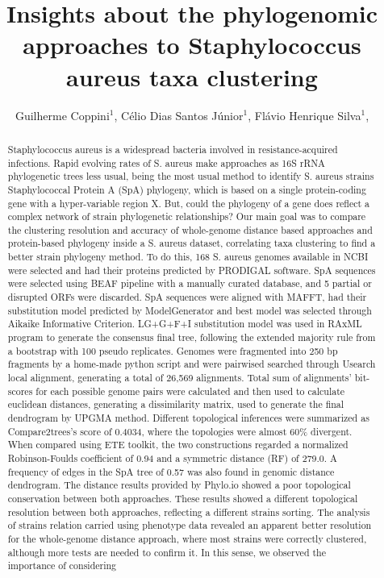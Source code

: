 \documentclass[twoside]{article}
\title{\vspace{-15mm}\fontsize{24pt}{10pt}\selectfont\textbf{ Insights about the phylogenomic approaches to Staphylococcus aureus taxa clustering }} %
\author{ Guilherme Coppini$^{1}$, Célio Dias Santos Júnior$^{1}$, Flávio Henrique Silva$^{1}$, }
\affil{ 1 Federal University of São Carlos

 }
\date{}
\begin{document}
  
  
  \maketitle %
  
  
  \thispagestyle{fancy} %
  
  
  \begin{abstract}
  Staphylococcus aureus is a widespread bacteria involved in resistance-acquired infections. Rapid evolving rates of S. aureus make approaches as 16S rRNA phylogenetic trees less usual, being the most usual method to identify S. aureus strains Staphylococcal Protein A  (SpA) phylogeny, which is based on a single protein-coding gene with a hyper-variable region X. But, could the phylogeny of  a gene does reflect a complex network of strain phylogenetic relationships? Our main goal was to compare the clustering resolution and accuracy of whole-genome distance based approaches and protein-based phylogeny inside a S. aureus dataset, correlating taxa clustering to find a better strain phylogeny method. To do this, 168 S. aureus genomes available in NCBI were selected and had their proteins predicted by PRODIGAL software. SpA sequences were selected using BEAF pipeline with a manually curated database, and 5 partial or disrupted ORFs were discarded. SpA sequences were aligned with MAFFT, had their substitution model predicted by ModelGenerator and best model was selected through Aikaike Informative Criterion. LG+G+F+I substitution model was used in RAxML program to generate the consensus final tree, following the extended majority rule from a bootstrap with 100 pseudo replicates. Genomes were fragmented into 250 bp fragments by a home-made python script and were pairwised searched through Usearch local alignment, generating a total of 26,569 alignments. Total sum of alignments' bit-scores for each possible genome pairs were calculated and then used to calculate euclidean distances, generating a dissimilarity matrix, used to generate the final dendrogram by UPGMA method. Different topological inferences were summarized as Compare2trees's score of 0.4034, where the topologies were almost 60\% divergent. When compared using ETE toolkit, the two constructions regarded a normalized Robinson-Foulds coefficient of 0.94 and a symmetric distance (RF) of 279.0. A frequency of edges in the SpA tree of 0.57 was also found in genomic distance dendrogram. The distance results provided by Phylo.io showed a poor topological conservation between both approaches. These results showed a different topological resolution between both approaches, reflecting a different strains sorting. The analysis of strains relation carried using phenotype data revealed an apparent better resolution for the whole-genome distance approach, where most strains were correctly clustered, although more tests are needed to  confirm it. In this sense, we observed the importance of considering 
\end{abstract}
\end{document}

